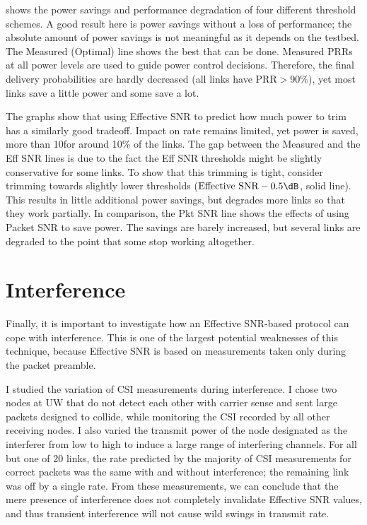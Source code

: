  shows the power savings and performance degradation of four different threshold schemes.
A good result here is power savings without a loss of performance; the absolute amount of power savings is not meaningful as it depends on the testbed.
The Measured (Optimal) line shows the best that can be done. Measured PRRs at all power levels are used to guide power control decisions. Therefore, the final delivery probabilities are hardly decreased (all links have PRR$>$90\%), yet most links save a little power and some save a lot. %

The graphs show that using Effective SNR to predict how much power to trim has a similarly good tradeoff. Impact on rate remains limited, yet power is saved, more than 10\dB for around 10\% of the links. The gap between the Measured and the Eff SNR lines is due to the fact the Eff SNR thresholds might be slightly conservative for some links. To show that this trimming is tight, consider trimming towards slightly lower thresholds ($\text{Effective SNR}-\text{0.5\dB}$, solid line). This results in little additional power savings, but degrades more links so that they work partially. In comparison, the Pkt SNR line shows the effects of using Packet SNR to save power. The savings are barely increased, but several links are degraded to the point that some stop working altogether.

\section{Interference}
\label{sec:interference}
Finally, it is important to investigate how an Effective SNR-based protocol can cope with interference. This is one of the largest potential weaknesses of this technique, because Effective SNR is based on measurements taken only during the packet preamble.%

I studied the variation of CSI measurements during interference. I chose two nodes at UW that do not detect each other with carrier sense and sent large packets designed to collide, while monitoring the CSI recorded by all other receiving nodes. I also varied the transmit power of the node designated as the interferer from low to high to induce a large range of interfering channels. For all but one of 20 links, the rate predicted by the majority of CSI measurements for correct packets was the same with and without interference; the remaining link was off by a single rate. From these measurements, we can conclude that the mere presence of interference does not completely invalidate Effective SNR values, and thus transient interference will not cause wild swings in transmit rate.

